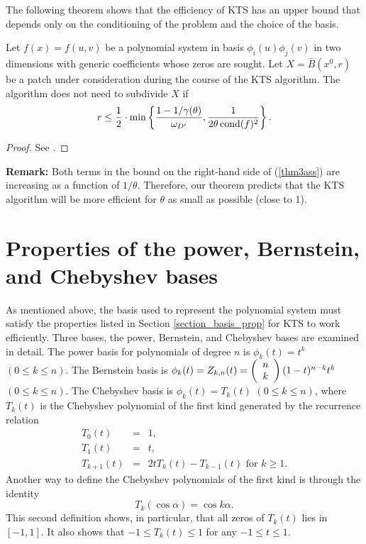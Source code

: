 \documentclass[12pt]{article}
\begin{document}
The following theorem shows that the efficiency of KTS has an upper bound
that depends only on the conditioning of the problem and the choice of
the basis.
\begin{thm}
\label{thm3} Let $f(x)=f(u,v)$ be a polynomial system in basis
$\phi_i(u)\phi_j(v)$ in two dimensions with generic coefficients
whose zeros are sought.  Let $X = \bar{B}(x^0,r)$ be a patch under
consideration during the course of the KTS algorithm. The
algorithm does not need to subdivide $X$ if
\begin{equation}
\label{thm3ass} r \leq \frac{1}{2}\cdot\min
\left\{\frac{1-1/\gamma(\theta)}{\omega_{D'}},
\frac{1}{2\theta\mathop{\rm{cond}}(f)^2}\right\}.
\end{equation}
\begin{proof} See \cite{srijuntongsiri_lsi}.
\end{proof}
\end{thm}
\begin{flushleft}
\textbf{Remark:} Both terms in the bound on the right-hand side of (\ref{thm3ass}) are
increasing as a function of $1/\theta$.
Therefore, our theorem predicts that the KTS algorithm will be more efficient
for $\theta$ as small as possible (close to 1).
\end{flushleft}

\section{Properties of the power, Bernstein, and Chebyshev bases}

As mentioned above, the basis used to represent the polynomial
system must satisfy the properties listed in Section
\ref{section_basis_prop} for KTS to work efficiently. Three bases,
the power, Bernstein, and Chebyshev bases are examined in detail.
The power basis for polynomials of degree $n$ is $\phi_k(t) = t^k$
$(0 \leq k \leq n)$. The Bernstein basis is $\phi_k(t) =
Z_{k,n}(t) = \left(\begin{array}{c} n\\ k \end{array} \right)(1-t)^{n-k}t^k$ $(0 \leq k \leq n)$.
The Chebyshev basis is $\phi_k(t) = T_k(t)$  $(0 \leq k \leq n)$,
where $T_k(t)$ is the Chebyshev polynomial of the first kind
generated by the recurrence relation
\begin{eqnarray}
T_0(t) &= &1, \nonumber \\
T_1(t) &= & t, \nonumber \\
T_{k+1}(t) & = & 2tT_k(t)-T_{k-1}(t) \textrm{ for } k \geq 1.
\label{cheb_recurrence}
\end{eqnarray}
Another way to define the Chebyshev polynomials of the first kind
is through the identity
\begin{equation}
\label{cheb_cos_form}
T_k(\cos \alpha) = \cos k\alpha.
\end{equation}
This second definition shows, in particular, that all zeros of $T_k(t)$
lies in $[-1,1]$.  It also shows that $-1 \leq T_k(t) \leq 1$ for any $-1 \leq t \leq 1$.
\end{document}

